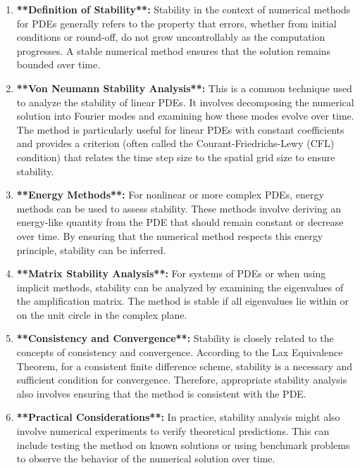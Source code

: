 \documentclass[10pt,a4paper]{report}
\begin{document}
\begin{enumerate}
\item \textbf{**Definition of Stability**:} Stability in the context of numerical methods for PDEs generally refers to the property that errors, whether from initial conditions or round-off, do not grow uncontrollably as the computation progresses. A stable numerical method ensures that the solution remains bounded over time.

\item \textbf{**Von Neumann Stability Analysis**:} This is a common technique used to analyze the stability of linear PDEs. It involves decomposing the numerical solution into Fourier modes and examining how these modes evolve over time. The method is particularly useful for linear PDEs with constant coefficients and provides a criterion (often called the Courant-Friedrichs-Lewy (CFL) condition) that relates the time step size to the spatial grid size to ensure stability.

\item \textbf{**Energy Methods**:} For nonlinear or more complex PDEs, energy methods can be used to assess stability. These methods involve deriving an energy-like quantity from the PDE that should remain constant or decrease over time. By ensuring that the numerical method respects this energy principle, stability can be inferred.

\item \textbf{**Matrix Stability Analysis**:} For systems of PDEs or when using implicit methods, stability can be analyzed by examining the eigenvalues of the amplification matrix. The method is stable if all eigenvalues lie within or on the unit circle in the complex plane.

\item \textbf{**Consistency and Convergence**:} Stability is closely related to the concepts of consistency and convergence. According to the Lax Equivalence Theorem, for a consistent finite difference scheme, stability is a necessary and sufficient condition for convergence. Therefore, appropriate stability analysis also involves ensuring that the method is consistent with the PDE.

\item \textbf{**Practical Considerations**:} In practice, stability analysis might also involve numerical experiments to verify theoretical predictions. This can include testing the method on known solutions or using benchmark problems to observe the behavior of the numerical solution over time.


\end{enumerate}
\end{document}
